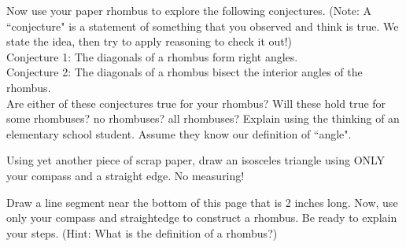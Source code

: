\documentclass[noauthor, nooutcomes,handout]{ximera}
\begin{document}
\vfill

\begin{problem}
Now use your paper rhombus to explore the following conjectures. (Note: A ``conjecture" is a statement of something that you observed and think is true.  We state the idea, then try to apply reasoning to check it out!) \\
\vskip 0.1in
Conjecture 1: The diagonals of a rhombus form right angles.\\

Conjecture 2: The diagonals of a rhombus bisect the interior angles of the rhombus.\\

Are either of these conjectures true for your rhombus? Will these hold true for some rhombuses? no rhombuses? all rhombuses? Explain using the thinking of an elementary school student. Assume they know our definition of ``angle".
\end{problem}


\vfill


\pagebreak

\begin{problem}
Using yet another piece of scrap paper, draw an isosceles triangle using ONLY your compass and a straight edge.  No measuring!

\end{problem}


\pagebreak

\begin{problem}
Draw a line segment near the bottom of this page that is 2 inches long. Now, use only your compass and straightedge to construct a rhombus.  Be ready to explain your steps. (Hint: What is the definition of a rhombus?)
\end{problem} 

\pagebreak
\end{document}
